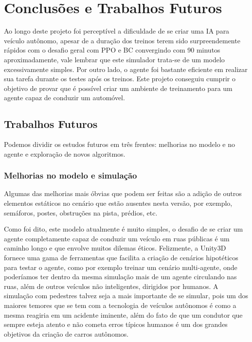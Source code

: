 \chapter*{Conclusões e Trabalhos Futuros}\label{cap:conclusao}

Ao longo deste projeto foi perceptível a dificuldade de se criar uma IA para veículo autônomo, apesar de a duração dos treinos terem sido surpreendemente rápidos com o desafio geral com PPO e BC convergindo com 90 minutos aproximadamente, vale lembrar que este simulador trata-se de um modelo excessivamente simples. Por outro lado, o agente foi bastante eficiente em realizar sua tarefa durante os testes após os treinos. Este projeto conseguiu cumprir o objetivo de provar que é possível criar um ambiente de treinamento para um agente capaz de conduzir um automóvel.

\section*{Trabalhos Futuros}

Podemos dividir os estudos futuros em três frentes: melhorias no modelo e no agente e exploração de novos algoritmos.

\subsection*{Melhorias no modelo e simulação}
Algumas das melhorias mais óbvias que podem ser feitas são a adição de outros elementos estáticos no cenário que estão ausentes nesta versão, por exemplo, semáforos, postes, obstruções na pista, prédios, etc. 

Como foi dito, este modelo atualmente é muito simples, o desafio de se criar um agente completamente capaz de conduzir um veículo em ruas públicas é um caminho longo e que envolve muitos dilemas éticos. Felizmente, a Unity3D fornece uma gama de ferramentas que facilita a criação de cenários hipotéticos para testar o agente, como por exemplo treinar um cenário multi-agente, onde poderíamos ter dentro da mesma simulação mais de um agente circulando nas ruas, além de outros veículos não inteligentes, dirigidos por humanos. A simulação com pedestres talvez seja a mais importante de se simular, pois um dos maiores temores que se tem com a tecnologia de veículos autônomos é como a mesma reagiria em um acidente iminente, além do fato de que um condutor que sempre esteja atento e não cometa erros típicos humanos é um dos grandes objetivos da criação de carros autônomos.


